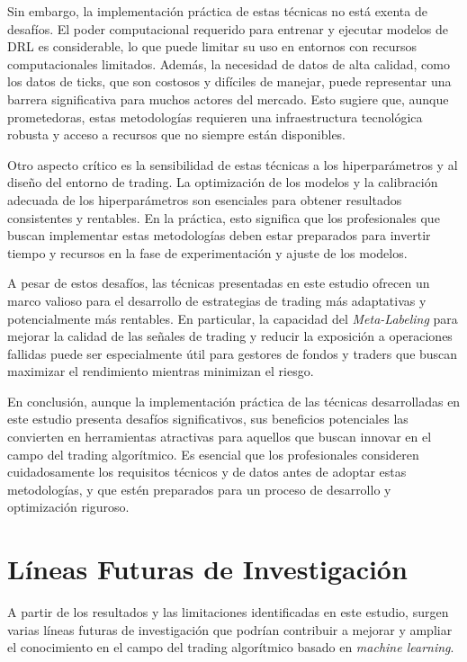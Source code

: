 \documentclass[a4paper,12pt, twoside]{report}
\begin{document}
Sin embargo, la implementación práctica de estas técnicas no está exenta de desafíos. El 
poder computacional requerido para entrenar y ejecutar modelos de DRL es considerable, 
lo que puede limitar su uso en entornos con recursos computacionales limitados. Además, 
la necesidad de datos de alta calidad, como los datos de ticks, que son costosos y 
difíciles de manejar, puede representar una barrera significativa para muchos actores 
del mercado. Esto sugiere que, aunque prometedoras, estas metodologías requieren una 
infraestructura tecnológica robusta y acceso a recursos que no siempre están disponibles.

Otro aspecto crítico es la sensibilidad de estas técnicas a los hiperparámetros y al 
diseño del entorno de trading. La optimización de los modelos y la calibración adecuada 
de los hiperparámetros son esenciales para obtener resultados consistentes y rentables. 
En la práctica, esto significa que los profesionales que buscan implementar estas 
metodologías deben estar preparados para invertir tiempo y recursos en la fase de 
experimentación y ajuste de los modelos.

A pesar de estos desafíos, las técnicas presentadas en este estudio ofrecen un marco 
valioso para el desarrollo de estrategias de trading más adaptativas y potencialmente 
más rentables. En particular, la capacidad del \textit{Meta-Labeling} para mejorar la 
calidad de las señales de trading y reducir la exposición a operaciones fallidas puede 
ser especialmente útil para gestores de fondos y traders que buscan maximizar el rendimiento 
mientras minimizan el riesgo.

En conclusión, aunque la implementación práctica de las técnicas desarrolladas en este 
estudio presenta desafíos significativos, sus beneficios potenciales las convierten en 
herramientas atractivas para aquellos que buscan innovar en el campo del trading algorítmico. 
Es esencial que los profesionales consideren cuidadosamente los requisitos técnicos y de 
datos antes de adoptar estas metodologías, y que estén preparados para un proceso de 
desarrollo y optimización riguroso.

\section{Líneas Futuras de Investigación}

A partir de los resultados y las limitaciones identificadas en este estudio, surgen 
varias líneas futuras de investigación que podrían contribuir a mejorar y ampliar el 
conocimiento en el campo del trading algorítmico basado en \textit{machine learning}.
\end{document}
